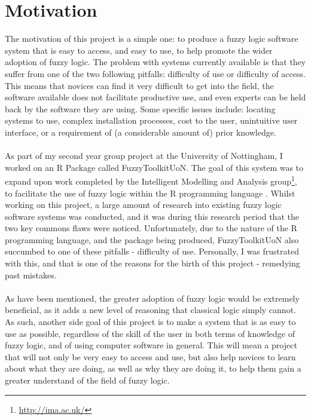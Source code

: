 \section{Motivation}
The motivation of this project is a simple one: to produce a fuzzy logic software system that is easy to access, and easy to use, to help promote the wider adoption of fuzzy logic. The problem with systems currently available is that they suffer from one of the two following pitfalls: difficulty of use or difficulty of access. This means that novices can find it very difficult to get into the field, the software available does not facilitate productive use, and even experts can be held back by the software they are using. Some specific issues include: locating systems to use, complex installation processes, cost to the user, unintuitive user interface, or a requirement of (a considerable amount of) prior knowledge. 
\ \\
\ \\
As part of my second year group project at the University of Nottingham, I worked on an R Package called FuzzyToolkitUoN. The goal of this system was to expand upon work completed by the Intelligent Modelling and Analysis group\footnote{\url{http://ima.ac.uk/}}, to facilitate the use of fuzzy logic within the R programming language \cite{wagner2011fuzzy}. Whilst working on this project, a large amount of research into existing fuzzy logic software systems was conducted, and it was during this research period that the two key commons flaws were noticed. Unfortunately, due to the nature of the R programming language, and the package being produced, FuzzyToolkitUoN also succumbed to one of these pitfalls - difficulty of use. Personally, I was frustrated with this, and that is one of the reasons for the birth of this project - remedying past mistakes.
\ \\
\ \\
As have been mentioned, the greater adoption of fuzzy logic would be extremely beneficial, as it adds a new level of reasoning that classical logic simply cannot. As such, another side goal of this project is to make a system that is as easy to use as possible, regardless of the skill of the user in both terms of knowledge of fuzzy logic, and of using computer software in general. This will mean a project that will not only be very easy to access and use, but also help novices to learn about what they are doing, as well as why they are doing it, to help them gain a greater understand of the field of fuzzy logic.
\ \\
